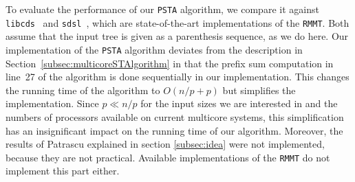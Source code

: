 To evaluate the performance of our {\tt PSTA} algorithm, we compare it against
{\tt libcds}~\cite{libcds} and {\tt sdsl}~\cite{sdsl}, which are
state-of-the-art implementations of the {\tt RMMT}.
Both assume that the input tree is given as a parenthesis sequence, as we do
here.
Our implementation of the {\tt PSTA} algorithm deviates from the description in
Section~\ref{subsec:multicoreSTAlgorithm} in that the prefix sum computation in
line~27 of the algorithm is done sequentially in our implementation.
This changes the running time of the algorithm to $O(n/p + p)$ but simplifies
the implementation.
Since $p \ll n/p$ for the input sizes we are interested in and the numbers of
processors available on current multicore systems, this simplification has an
insignificant impact on the running time of our algorithm.
Moreover, the results of Patrascu explained in section \ref{subsec:idea} were
not implemented, because they are not practical.
Available implementations of the {\tt RMMT} do not implement this part either.
